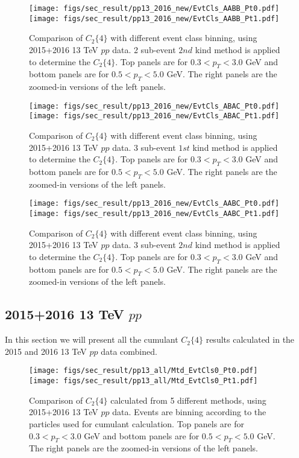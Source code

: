 \begin{figure}[H]
\centering
\texttt{[image: figs/sec\_result/pp13\_2016\_new/EvtCls\_AABB\_Pt0.pdf]}
\texttt{[image: figs/sec\_result/pp13\_2016\_new/EvtCls\_AABB\_Pt1.pdf]}
\caption{Comparison of $C_{2}\{4\}$ with different event class binning, using 2015+2016 13 TeV $pp$ data. 2 sub-event $2nd$ kind method is applied to determine the $C_{2}\{4\}$. Top panels are for $0.3<p_{T}<3.0$ GeV and bottom panels are for $0.5<p_{T}<5.0$ GeV. The right panels are the zoomed-in versions of the left panels.}
\label{fig:result_pp13_2016_new_EvtCls_AABB}
\end{figure}

\begin{figure}[H]
\centering
\texttt{[image: figs/sec\_result/pp13\_2016\_new/EvtCls\_ABAC\_Pt0.pdf]}
\texttt{[image: figs/sec\_result/pp13\_2016\_new/EvtCls\_ABAC\_Pt1.pdf]}
\caption{Comparison of $C_{2}\{4\}$ with different event class binning, using 2015+2016 13 TeV $pp$ data. 3 sub-event $1st$ kind method is applied to determine the $C_{2}\{4\}$. Top panels are for $0.3<p_{T}<3.0$ GeV and bottom panels are for $0.5<p_{T}<5.0$ GeV. The right panels are the zoomed-in versions of the left panels.}
\label{fig:result_pp13_2016_new_EvtCls_ABAC}
\end{figure}

\begin{figure}[H]
\centering
\texttt{[image: figs/sec\_result/pp13\_2016\_new/EvtCls\_AABC\_Pt0.pdf]}
\texttt{[image: figs/sec\_result/pp13\_2016\_new/EvtCls\_AABC\_Pt1.pdf]}
\caption{Comparison of $C_{2}\{4\}$ with different event class binning, using 2015+2016 13 TeV $pp$ data. 3 sub-event $2nd$ kind method is applied to determine the $C_{2}\{4\}$. Top panels are for $0.3<p_{T}<3.0$ GeV and bottom panels are for $0.5<p_{T}<5.0$ GeV. The right panels are the zoomed-in versions of the left panels.}
\label{fig:result_pp13_2016_new_EvtCls_AABC}
\end{figure}



\subsection{2015+2016 13 TeV $pp$}
In this section we will present all the cumulant $C_{2}\{4\}$ results calculated in the 2015 and 2016 13 TeV $pp$ data combined. 

\begin{figure}[H]
\centering
\texttt{[image: figs/sec\_result/pp13\_all/Mtd\_EvtCls0\_Pt0.pdf]}
\texttt{[image: figs/sec\_result/pp13\_all/Mtd\_EvtCls0\_Pt1.pdf]}
\caption{Comparison of $C_{2}\{4\}$ calculated from 5 different methods, using 2015+2016 13 TeV $pp$ data. Events are binning according to the particles used for cumulant calculation. Top panels are for $0.3<p_{T}<3.0$ GeV and bottom panels are for $0.5<p_{T}<5.0$ GeV. The right panels are the zoomed-in versions of the left panels.}
\label{fig:result_pp13_all_Mtd_EvtCls0}
\end{figure}

